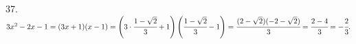 37. $3x^2-2x-1=(3x+1)(x-1)=\left(3\cdot\cfrac{1-\sqrt{2}}{3}+1\right)\left(\cfrac{1-\sqrt{2}}{3}-1\right)=\cfrac{(2-\sqrt{2})(-2-\sqrt{2})}{3}=\cfrac{2-4}{3}=-\cfrac{2}{3}.$\\
